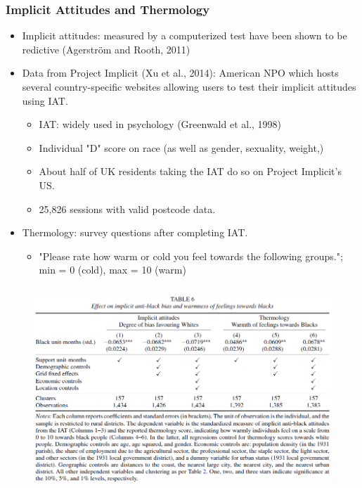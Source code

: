 \documentclass[dvipdfmx,11pt]{beamer}
\begin{document}
\begin{frame}\frametitle{Implicit Attitudes and Thermology}
  \begin{itemize}
    \item Implicit attitudes: measured by a computerized test have been shown to be redictive (Agerstr\"{o}m and Rooth, 2011)
    \item Data from Project Implicit (Xu et al., 2014): American NPO which hosts several country-specific websites allowing users to test their implicit attitudes using IAT.
    \begin{itemize}
      \item IAT: widely used in psychology (Greenwald et al., 1998)
      \item Individual "D" score on race (as well as gender, sexuality, weight,)
      \item About half of UK residents taking the IAT do so on Project  Implicit's US.
      \item 25,826 sessions with valid postcode data.
    \end{itemize}
    \item Thermology: survey questions after completing IAT.
    \begin{itemize}
      \item "Please rate how warm or cold you feel towards the following groups."; min = 0 (cold), max = 10 (warm)
    \end{itemize}
  \end{itemize}
\end{frame}

\begin{frame}\frametitle{}
  \begin{figure}
    \centering
    \includegraphics[scale = .6]{os1027tanji/T6}
  \end{figure}
\end{frame}
\end{document}

